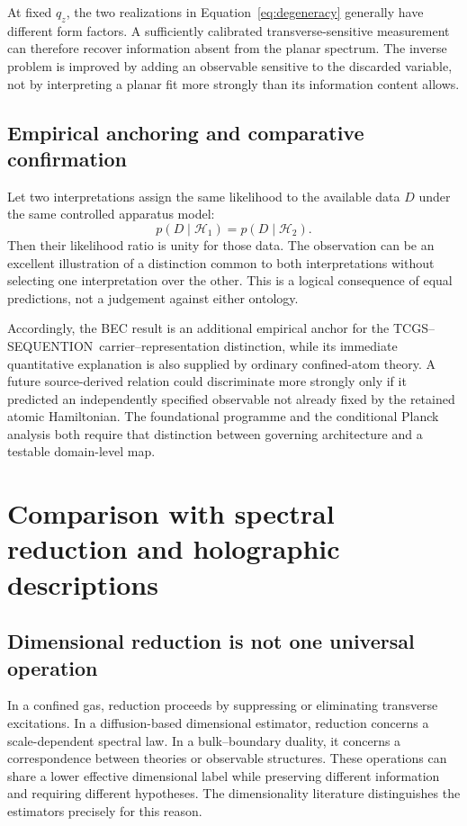 \documentclass[11pt,a4paper]{article}
\theoremstyle{definition}
\theoremstyle{remark}
\newcommand{\TCGS}{TCGS--SEQUENTION}
\begin{document}
At fixed $q_z$, the two realizations in Equation~\eqref{eq:degeneracy} generally have different form factors. A sufficiently calibrated transverse-sensitive measurement can therefore recover information absent from the planar spectrum. The inverse problem is improved by adding an observable sensitive to the discarded variable, not by interpreting a planar fit more strongly than its information content allows.

\subsection{Empirical anchoring and comparative confirmation}
Let two interpretations assign the same likelihood to the available data $D$ under the same controlled apparatus model:
\begin{equation}
 p(D\mid\mathcal H_1)=p(D\mid\mathcal H_2).
 \label{eq:equal_likelihood}
\end{equation}
Then their likelihood ratio is unity for those data. The observation can be an excellent illustration of a distinction common to both interpretations without selecting one interpretation over the other. This is a logical consequence of equal predictions, not a judgement against either ontology.

Accordingly, the BEC result is an additional empirical anchor for the \TCGS\ carrier--representation distinction, while its immediate quantitative explanation is also supplied by ordinary confined-atom theory. A future source-derived relation could discriminate more strongly only if it predicted an independently specified observable not already fixed by the retained atomic Hamiltonian. The foundational programme and the conditional Planck analysis both require that distinction between governing architecture and a testable domain-level map.\cite{foundation,planck}

\section{Comparison with spectral reduction and holographic descriptions}
\label{sec:comparisons}
\subsection{Dimensional reduction is not one universal operation}
In a confined gas, reduction proceeds by suppressing or eliminating transverse excitations. In a diffusion-based dimensional estimator, reduction concerns a scale-dependent spectral law. In a bulk--boundary duality, it concerns a correspondence between theories or observable structures. These operations can share a lower effective dimensional label while preserving different information and requiring different hypotheses. The dimensionality literature distinguishes the estimators precisely for this reason.\cite{carlip}
\end{document}
